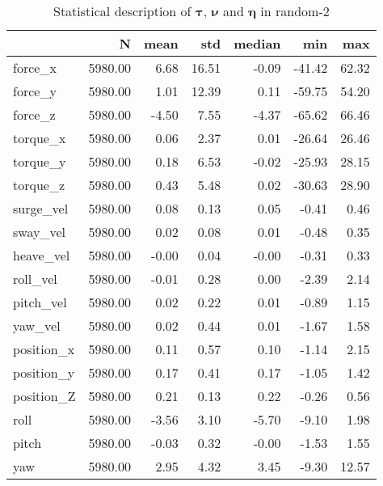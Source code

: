 \begin{table}[hb]
\centering
\caption{Statistical description of $\boldsymbol{\tau}$, $\boldsymbol{\nu}$ and $\boldsymbol{\eta}$ in random-2}
\label{tab:description-random-2}
\begin{tabular}{lrrrrrr}
\toprule
{} &       N &  mean &   std & median &    min &   max \\
\midrule
force\_x    & 5980.00 &  6.68 & 16.51 &  -0.09 & -41.42 & 62.32 \\
force\_y    & 5980.00 &  1.01 & 12.39 &   0.11 & -59.75 & 54.20 \\
force\_z    & 5980.00 & -4.50 &  7.55 &  -4.37 & -65.62 & 66.46 \\
torque\_x   & 5980.00 &  0.06 &  2.37 &   0.01 & -26.64 & 26.46 \\
torque\_y   & 5980.00 &  0.18 &  6.53 &  -0.02 & -25.93 & 28.15 \\
torque\_z   & 5980.00 &  0.43 &  5.48 &   0.02 & -30.63 & 28.90 \\
surge\_vel  & 5980.00 &  0.08 &  0.13 &   0.05 &  -0.41 &  0.46 \\
sway\_vel   & 5980.00 &  0.02 &  0.08 &   0.01 &  -0.48 &  0.35 \\
heave\_vel  & 5980.00 & -0.00 &  0.04 &  -0.00 &  -0.31 &  0.33 \\
roll\_vel   & 5980.00 & -0.01 &  0.28 &   0.00 &  -2.39 &  2.14 \\
pitch\_vel  & 5980.00 &  0.02 &  0.22 &   0.01 &  -0.89 &  1.15 \\
yaw\_vel    & 5980.00 &  0.02 &  0.44 &   0.01 &  -1.67 &  1.58 \\
position\_x & 5980.00 &  0.11 &  0.57 &   0.10 &  -1.14 &  2.15 \\
position\_y & 5980.00 &  0.17 &  0.41 &   0.17 &  -1.05 &  1.42 \\
position\_Z & 5980.00 &  0.21 &  0.13 &   0.22 &  -0.26 &  0.56 \\
roll       & 5980.00 & -3.56 &  3.10 &  -5.70 &  -9.10 &  1.98 \\
pitch      & 5980.00 & -0.03 &  0.32 &  -0.00 &  -1.53 &  1.55 \\
yaw        & 5980.00 &  2.95 &  4.32 &   3.45 &  -9.30 & 12.57 \\
\bottomrule
\end{tabular}
\end{table}
